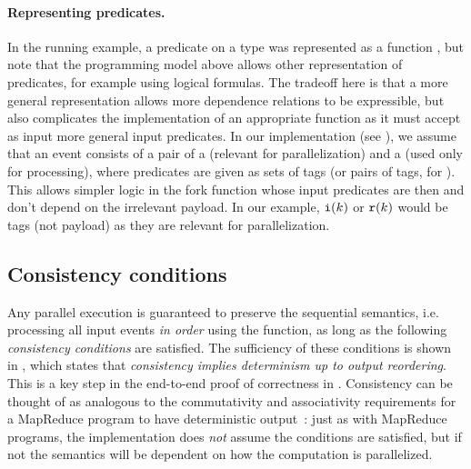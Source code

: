 \paragraph{Representing predicates.}
In the running example, a predicate on a type  was represented
as a function , but note that the programming model above allows other
representation of predicates, for example using logical formulas.
The tradeoff here is that a more general representation allows
more dependence relations to be expressible, but also complicates the
implementation of an appropriate  function as it must accept
as input more general input predicates.
In our implementation (see ), we assume
that an event consists of a pair of a  (relevant for parallelization) and a  (used only for processing),
where predicates are given as sets of tags (or pairs of tags, for ).
This allows simpler logic in the fork function whose input predicates
are then  and don't depend on the irrelevant payload.
In our example, $\texttt{i}(k)$ or $\texttt{r}(k)$ would be tags (not payload)
as they are relevant for parallelization.

\subsection{Consistency conditions}
\label{dgs:ssec:prog-model-correctness}

Any parallel execution
is guaranteed to preserve the sequential semantics, i.e. processing
all input events \emph{in order} using the  function,
as long as the following \emph{consistency conditions} are
satisfied.
The sufficiency of these conditions is shown in
, which states
that \emph{consistency implies determinism up to output reordering}.
This is a key step in the end-to-end proof of correctness in .
Consistency can be thought of as analogous to the commutativity and
associativity requirements for a MapReduce program to have
deterministic output~\cite{dean2008map-reduce}: just as with MapReduce
programs, the implementation does \emph{not} assume the conditions are
satisfied, but if not the semantics will be dependent on how the
computation is parallelized.


